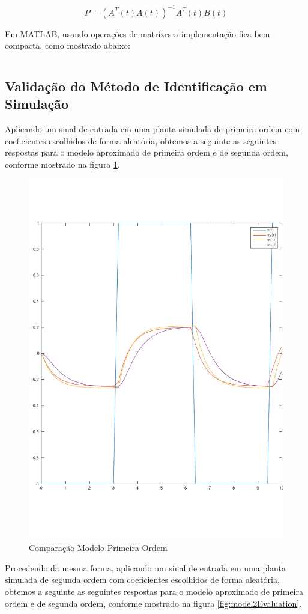 \documentclass[a4paper,11pt]{article}
\begin{document}
\begin{equation}
    P = \left(A^T(t) A(t)\right)^{-1} A^T(t) B(t)
\end{equation}

Em MATLAB, usando operações de matrizes a implementação fica bem compacta, como mostrado abaixo:

\inputminted[frame=single,framesep=10pt]{matlab}{../src/matlab/secondordertf.m}

\subsection{Validação do Método de Identificação em Simulação}

Aplicando um sinal de entrada em uma planta simulada de primeira ordem com coeficientes escolhidos de forma aleatória, obtemos a seguinte as seguintes respostas para o modelo aproximado de primeira ordem e de segunda ordem, conforme mostrado na figura \ref{fig:model1Evaluation}.

\begin{figure}[H]
    \centering
    \includegraphics[width=0.6\linewidth]{tex/img/model1Evaluation.pdf}
    \caption{Comparação Modelo Primeira Ordem}
    \label{fig:model1Evaluation}
\end{figure}

Procedendo da mesma forma, aplicando um sinal de entrada em uma planta simulada de segunda ordem com coeficientes escolhidos de forma aleatória, obtemos a seguinte as seguintes respostas para o modelo aproximado de primeira ordem e de segunda ordem, conforme mostrado na figura \ref{fig:model2Evaluation}.
\end{document}
